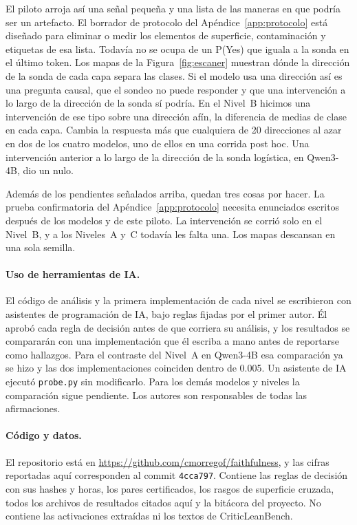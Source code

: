 \documentclass[10pt]{article}
\newcommand{\vr}[1]{\texttt{#1}}
\begin{document}
El piloto arroja así una señal pequeña y una lista de las maneras en que podría ser un artefacto. El borrador de
protocolo del Apéndice~\ref{app:protocolo} está diseñado para eliminar o medir los elementos de superficie,
contaminación y etiquetas de esa lista. Todavía no se ocupa de un P(Yes) que iguala a la sonda en el último token. Los mapas de la
Figura~\ref{fig:escaner} muestran dónde la dirección de la sonda de cada capa separa las clases. Si el modelo usa una dirección así es una pregunta causal, que el sondeo no puede responder y que una intervención a lo largo de la dirección de la
sonda sí podría.
En el Nivel~B hicimos una intervención de ese tipo sobre una dirección afín, la diferencia de medias de clase en cada
capa. Cambia la respuesta más que cualquiera de 20 direcciones al azar en dos de los cuatro modelos, uno de ellos en una corrida
post hoc.
Una intervención anterior a lo largo de la dirección de la sonda logística, en Qwen3-4B, dio un nulo.

Además de los pendientes señalados arriba, quedan tres cosas por hacer. La prueba confirmatoria del Apéndice~\ref{app:protocolo} necesita enunciados escritos
después de los modelos y de este piloto. La intervención se corrió solo en el Nivel~B, y a los Niveles~A y~C todavía
les falta una. Los mapas descansan en una sola semilla.

\paragraph{Uso de herramientas de IA.}
El código de análisis y la primera implementación de cada nivel se escribieron con asistentes de programación de IA,
bajo reglas fijadas por el primer autor. Él aprobó cada regla de decisión antes de que corriera su análisis, y los
resultados se compararán con una implementación que él escriba a mano antes de reportarse como hallazgos. Para el
contraste del Nivel~A en Qwen3-4B esa comparación ya se hizo y las dos implementaciones coinciden dentro de 0.005.
Un asistente de IA ejecutó \vr{probe.py} sin modificarlo. Para los demás modelos y niveles la comparación sigue
pendiente. Los autores son responsables de todas las afirmaciones.

\paragraph{Código y datos.}
El repositorio está en \url{https://github.com/cmorregof/faithfulness}, y las cifras reportadas aquí corresponden
al commit \vr{4cca797}. Contiene las reglas de decisión con sus hashes y horas, los pares certificados, los
rasgos de superficie cruzada, todos los archivos de resultados citados aquí y la bitácora del proyecto. No
contiene las activaciones extraídas ni los textos de CriticLeanBench.
\end{document}
